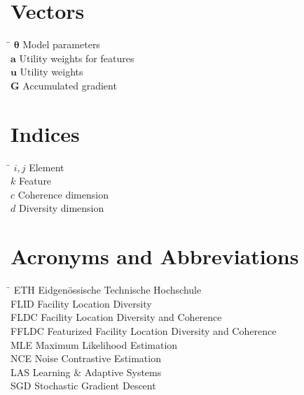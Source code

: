 \section*{Vectors}

\begin{tabbing}
  \hspace*{1.6cm} \= \kill
  $\boldsymbol{\theta}$ \> Model parameters \\ [0.5ex]
  $\mathbf{a}$ \> Utility weights for features \\ [0.5ex]
  $\mathbf{u}$ \> Utility weights \\ [0.5ex]
  $\mathbf{G}$ \> Accumulated gradient \\ [0.5ex]
\end{tabbing}

\section*{Indices}

\begin{tabbing}
  \hspace*{1.6cm} \= \kill
  $i, j$ \> Element \\ [0.5ex]
  $k$ \> Feature \\ [0.5ex]
  $c$ \> Coherence dimension \\ [0.5ex]
  $d$ \> Diversity dimension \\ [0.5ex]
\end{tabbing}

\section*{Acronyms and Abbreviations}
\begin{tabbing}
 \hspace*{1.6cm}  \= \kill
 ETH \> Eidgenössische Technische Hochschule \\[0.5ex]
 FLID \> Facility Location Diversity \\[0.5ex]
 FLDC \> Facility Location Diversity and Coherence \\[0.5ex]
 FFLDC \> Featurized Facility Location Diversity and Coherence \\ [0.5ex]
 MLE \> Maximum Likelihood Estimation \\ [0.5ex]
 NCE \> Noise Contrastive Estimation \\ [0.5ex]
 LAS \> Learning \& Adaptive Systems \\ [0.5ex]
 SGD \> Stochastic Gradient Descent \\ [0.5ex]

\end{tabbing}